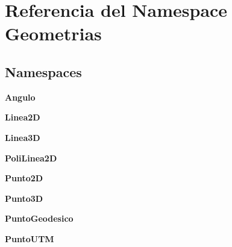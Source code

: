 \section{Referencia del Namespace Geometrias}
\label{namespaceGeometrias}
\subsection*{Namespaces}
\begin{DoxyCompactItemize}
\item 
{\bf Angulo}
\item 
{\bf Linea2\-D}
\item 
{\bf Linea3\-D}
\item 
{\bf Poli\-Linea2\-D}
\item 
{\bf Punto2\-D}
\item 
{\bf Punto3\-D}
\item 
{\bf Punto\-Geodesico}
\item 
{\bf Punto\-U\-T\-M}
\end{DoxyCompactItemize}
